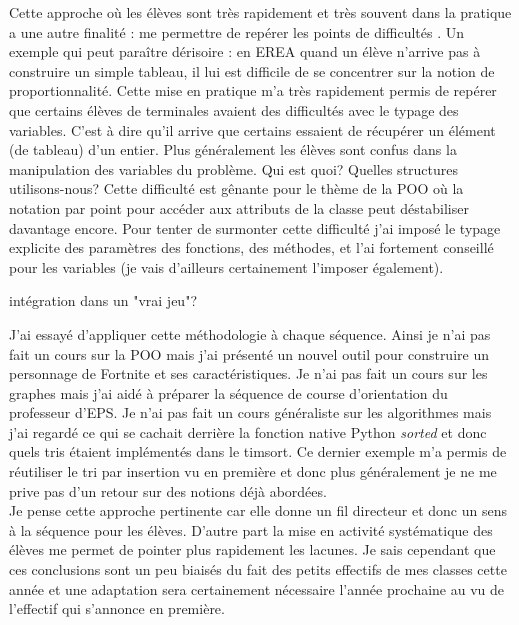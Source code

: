 \documentclass[a4paper,11pt]{article}
\begin{document}
Cette approche où les élèves sont très rapidement et très souvent dans la pratique a une autre finalité : me permettre de repérer les points de difficultés . Un exemple qui peut paraître dérisoire : en EREA quand un élève n'arrive pas à construire un simple tableau, il lui est difficile de se concentrer sur la notion de proportionnalité. Cette mise en pratique  m'a très rapidement permis de repérer que certains élèves de terminales avaient des difficultés avec le typage des variables. C'est à dire qu'il arrive que certains essaient de récupérer un élément (de tableau) d'un entier. Plus généralement les élèves sont confus dans la manipulation des variables du problème. Qui est quoi? Quelles structures utilisons-nous? Cette difficulté est gênante pour le thème de la POO où la notation par point pour accéder aux attributs de la classe peut déstabiliser davantage encore. Pour tenter de surmonter cette difficulté j'ai imposé le typage explicite des paramètres des fonctions, des méthodes, et l'ai fortement conseillé pour les variables (je vais d'ailleurs certainement l'imposer également).

intégration dans un "vrai jeu"?

J'ai essayé d'appliquer cette méthodologie à chaque séquence. Ainsi je n'ai pas fait un cours sur la POO mais j'ai présenté un nouvel outil pour construire un personnage de Fortnite et ses caractéristiques. Je n'ai pas fait un cours sur les graphes mais j'ai aidé à préparer la séquence de course d'orientation du professeur d'EPS. Je n'ai pas fait un cours généraliste sur les algorithmes  mais j'ai regardé ce qui se cachait derrière la fonction native Python \emph{sorted} et donc quels tris étaient implémentés dans le timsort. Ce dernier exemple m'a permis de réutiliser le tri par insertion vu en première et donc plus généralement je ne me prive pas d'un retour sur des notions déjà abordées.\\
Je pense cette approche pertinente car elle donne un fil directeur et donc un sens à la séquence pour les élèves. D'autre part la mise en activité systématique des élèves me permet de pointer plus rapidement les lacunes. Je sais cependant que ces conclusions sont un peu biaisés du fait des petits effectifs de mes classes cette année et une adaptation sera certainement nécessaire l'année prochaine au vu de l'effectif qui s'annonce en première.
\end{document}
